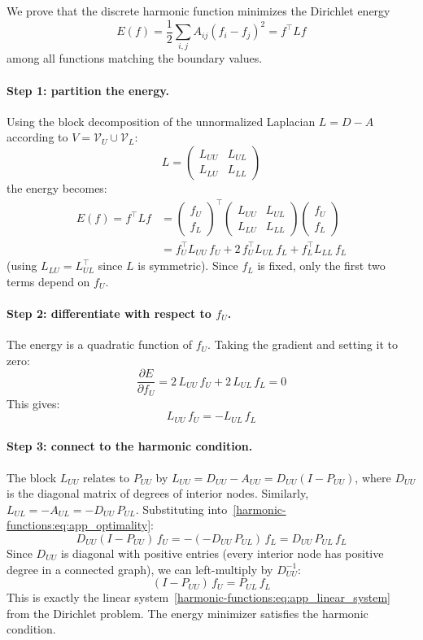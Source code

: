 \begin{notechapter}
We prove that the discrete harmonic function minimizes the Dirichlet energy
\[
E(f) = \frac{1}{2}\sum_{i,j}A_{ij}(f_i - f_j)^2 = f^\top Lf
\]
among all
functions matching the boundary values.

\paragraph{Step 1: partition the energy.} Using the block decomposition of the
unnormalized Laplacian $L = D - A$ according to
$V = \mathcal{V}_U \cup \mathcal{V}_L$:
\[
L = \begin{pmatrix} L_{UU} & L_{UL} \\ L_{LU} & L_{LL} \end{pmatrix}
\]
the energy becomes:
\begin{align}
E(f) = f^\top Lf
&= \begin{pmatrix} f_U \\ f_L \end{pmatrix}^\top
   \begin{pmatrix} L_{UU} & L_{UL} \\ L_{LU} & L_{LL} \end{pmatrix}
   \begin{pmatrix} f_U \\ f_L \end{pmatrix} \\
&= f_U^\top L_{UU}\,f_U + 2\,f_U^\top L_{UL}\,f_L
   + f_L^\top L_{LL}\,f_L
\end{align}
(using $L_{LU} = L_{UL}^\top$ since $L$ is symmetric). Since $f_L$ is
fixed, only the first two terms depend on $f_U$.

\paragraph{Step 2: differentiate with respect to $f_U$.} The energy is a
quadratic function of $f_U$. Taking the gradient and setting it to zero:
\[
\frac{\partial E}{\partial f_U} = 2\,L_{UU}\,f_U + 2\,L_{UL}\,f_L = 0
\]
This gives:
\begin{equation}
\label{harmonic-functions:eq:app_optimality}
L_{UU}\,f_U = -L_{UL}\,f_L
\end{equation}

\paragraph{Step 3: connect to the harmonic condition.} The block $L_{UU}$
relates to $P_{UU}$ by $L_{UU} = D_{UU} - A_{UU} = D_{UU}(I - P_{UU})$,
where $D_{UU}$ is the diagonal matrix of degrees of interior nodes.
Similarly, $L_{UL} = -A_{UL} = -D_{UU}\,P_{UL}$. Substituting
into~\eqref{harmonic-functions:eq:app_optimality}:
\[
D_{UU}(I - P_{UU})\,f_U = -(-D_{UU}\,P_{UL})\,f_L = D_{UU}\,P_{UL}\,f_L
\]
Since $D_{UU}$ is diagonal with positive entries (every interior node has
positive degree in a connected graph), we can left-multiply by
$D_{UU}^{-1}$:
\[
(I - P_{UU})\,f_U = P_{UL}\,f_L
\]
This is exactly the linear system~\eqref{harmonic-functions:eq:app_linear_system} from the
Dirichlet problem. The energy minimizer satisfies the harmonic condition.


\end{notechapter}
